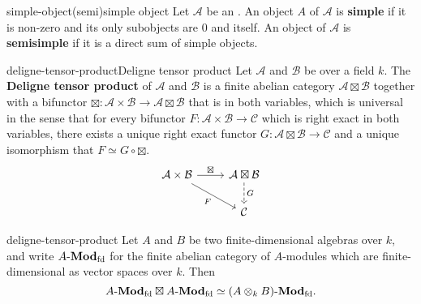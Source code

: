 \begin{topic}{simple-object}{(semi)simple object}
    Let $\mathcal{A}$ be an . An object $A$ of $\mathcal{A}$ is \textbf{simple} if it is non-zero and its only subobjects are $0$ and itself. An object of $\mathcal{A}$ is \textbf{semisimple} if it is a direct sum of simple objects.
\end{topic}

\begin{topic}{deligne-tensor-product}{Deligne tensor product}
    Let $\mathcal{A}$ and $\mathcal{B}$ be   over a field $k$. The \textbf{Deligne tensor product} of $\mathcal{A}$ and $\mathcal{B}$ is a finite abelian category $\mathcal{A} \boxtimes \mathcal{B}$ together with a bifunctor $\boxtimes : \mathcal{A} \times \mathcal{B} \to \mathcal{A} \boxtimes \mathcal{B}$ that is  in both variables, which is universal in the sense that for every bifunctor $F : \mathcal{A} \times \mathcal{B} \to \mathcal{C}$ which is right exact in both variables, there exists a unique right exact functor $G : \mathcal{A} \boxtimes \mathcal{B} \to \mathcal{C}$ and a unique  isomorphism that $F \simeq G \circ \boxtimes$.
    \[ \begin{tikzcd}
        \mathcal{A} \times \mathcal{B} \arrow{r}{\boxtimes} \arrow[swap]{dr}{F} & \mathcal{A} \boxtimes \mathcal{B} \arrow[dashed]{d}{G} \\
        & \mathcal{C}
    \end{tikzcd} \]
\end{topic}

\begin{example}{deligne-tensor-product}
    Let $A$ and $B$ be two finite-dimensional algebras over $k$, and write $A\textup{-}\textbf{Mod}_\textup{fd}$ for the finite abelian category of $A$-modules which are finite-dimensional as vector spaces over $k$. Then
    \[ A\textup{-}\textbf{Mod}_\textup{fd} \boxtimes A\textup{-}\textbf{Mod}_\textup{fd} \simeq (A \otimes_k B)\textup{-}\textbf{Mod}_\textup{fd} . \]
\end{example}
